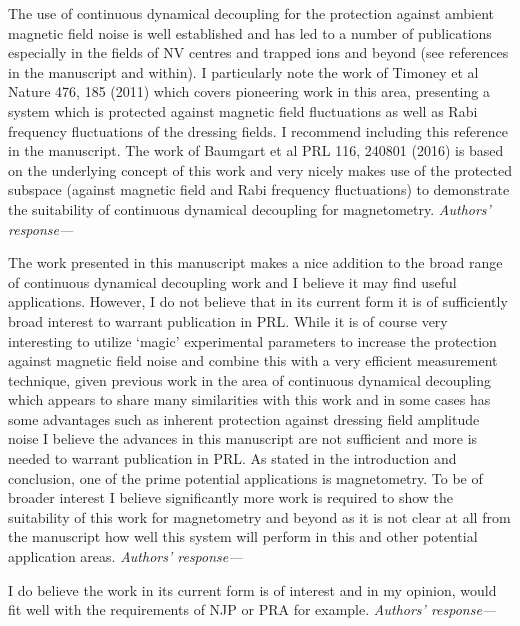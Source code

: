 \documentclass[letterpaper]{article}
\newenvironment{refcomment}{\singlespacing\verbatim}{\endverbatim}
\newcommand{\response}{\emph{Authors' response---}}
\begin{document}
\begin{refcomment}
The use of continuous dynamical decoupling for the protection against 
ambient magnetic field noise is well established and has led to a 
number of publications especially in the fields of NV centres and 
trapped ions and beyond (see references in the manuscript and within).
I particularly note the work of Timoney et al Nature 476, 185 (2011) 
which covers pioneering work in this area, presenting a system which 
is protected against magnetic field fluctuations as well as Rabi 
frequency fluctuations of the dressing fields. I recommend including 
this reference in the manuscript. The work of Baumgart et al PRL 116, 
240801 (2016) is based on the underlying concept of this work and very
nicely makes use of the protected subspace (against magnetic field and
Rabi frequency fluctuations) to demonstrate the suitability of 
continuous dynamical decoupling for magnetometry.
\end{refcomment}
\response 


\begin{refcomment}
The work presented in this manuscript makes a nice addition to the 
broad range of continuous dynamical decoupling work and I believe it 
may find useful applications. However, I do not believe that in its 
current form it is of sufficiently broad interest to warrant 
publication in PRL. While it is of course very interesting to utilize 
‘magic’ experimental parameters to increase the protection against
magnetic field noise and combine this with a very efficient 
measurement technique, given previous work in the area of continuous 
dynamical decoupling which appears to share many similarities with
this work and in some cases has some advantages such as inherent 
protection against dressing field amplitude noise I believe the 
advances in this manuscript are not sufficient and more is needed to
warrant publication in PRL. As stated in the introduction and 
conclusion, one of the prime potential applications is magnetometry. 
To be of broader interest I believe significantly more work is 
required to show the suitability of this work for magnetometry and 
beyond as it is not clear at all from the manuscript how well this 
system will perform in this and other potential application areas.
\end{refcomment}
\response


\begin{refcomment}
I do believe the work in its current form is of interest and in my 
opinion, would fit well with the requirements of NJP or PRA for 
example.
\end{refcomment}
\response 
\end{document}
